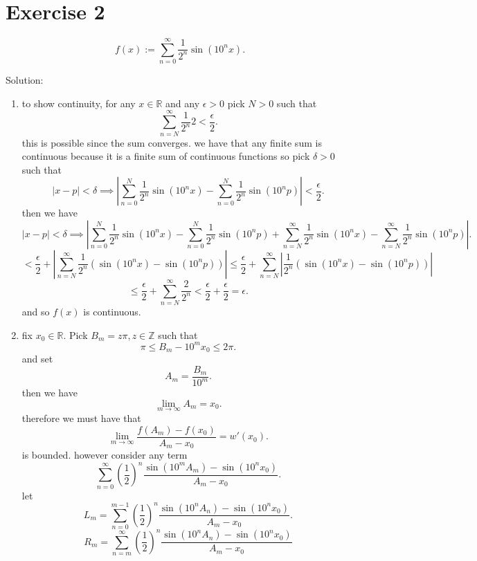 \documentclass[11pt]{article}
\newcommand{\solution}[1]{{{\textcolor{header}{Solution:} \textcolor{solution}{#1}}}}
\begin{document}
\section{Exercise 2}
\[
f(x) := \sum_{n=0}^{\infty}\frac{1}{2^{n}}\sin(10^{n}x)
.\] 
\solution{
    \begin{enumerate}
        \item to show continuity, for any $x \in \mathbb{R}$ and any $\epsilon > 0$ pick $N > 0$ such that
            \[
            \sum_{n=N}^{\infty}\frac{1}{2^{n}}2 < \frac{\epsilon}{2}
            .\] 
            this is possible since the sum converges.
            we have that any finite sum is continuous because it is a finite sum of continuous functions so pick $\delta > 0$
            such that
            \[
            |x - p| < \delta \implies |\sum_{n=0}^{N}\frac{1}{2^{n}}\sin(10^{n}x) - \sum_{n=0}^{N}\frac{1}{2^{n}}\sin(10^{n}p)| < \frac{\epsilon}{2}
            .\] 
            then we have
            \[
            |x-p| < \delta \implies |\sum_{n=0}^{N}\frac{1}{2^{n}}\sin(10^{n}x) - \sum_{n=0}^{N}\frac{1}{2^{n}}\sin(10^{n}p) + \sum_{n=N}^{\infty}\frac{1}{2^{n}}\sin(10^{n}x) - \sum_{n=N}^{\infty}\frac{1}{2^{n}}\sin(10^{n}p)|
            .\] 
            \[
             < \frac{\epsilon}{2} + |\sum_{n=N}^{\infty}\frac{1}{2^{n}}(\sin(10^{n}x)-\sin(10^{n}p))| \le \frac{\epsilon}{2} + \sum_{n=N}^{\infty}|\frac{1}{2^{n}}(\sin(10^{n}x)-\sin(10^{n}p))|
         \]
         \[
             \le \frac{\epsilon}{2} + \sum_{n=N}^{\infty}\frac{2}{2^{n}} < \frac{\epsilon}{2} + \frac{\epsilon}{2} = \epsilon
            .\] 
            and so $f(x)$ is continuous.
        \item 
            fix $x_0 \in \mathbb{R}$. Pick $B_m = z\pi, z \in \mathbb{Z}$ such that 
            \[
            \pi \le B_m - 10^{m}x_0 \le 2\pi
            .\] 
            and set
            \[
            A_m = \frac{B_m}{10^{m}}
            .\] 
            then we have
            \[
            \lim_{m\to \infty}A_m = x_0
            .\] 
            therefore we must have that
            \[
            \lim_{m\to \infty}\frac{f(A_m)-f(x_0)}{A_m-x_0} = w'(x_0)
            .\] 
            is bounded. however consider any term
            \[
            \sum_{n=0}^{\infty}(\frac{1}{2})^{n}\frac{\sin(10^{m}A_m)-\sin(10^{n}x_0)}{A_m-x_0}
            .\] 
            let
            \[
            L_m = \sum_{n=0}^{m-1}(\frac{1}{2})^{n}\frac{\sin(10^{n}A_n)-\sin(10^{n}x_0)}{A_m-x_0}
            .\] 
            \[
            R_m = \sum_{n=m}^{\infty}(\frac{1}{2})^{n}\frac{\sin(10^{n}A_n)-\sin(10^{n}x_0)}{A_m-x_0}
\]
\end{enumerate}}
\end{document}
